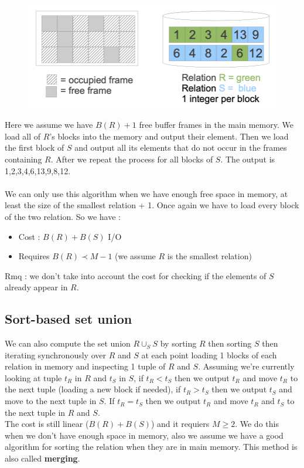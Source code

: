 \documentclass[12pt,a4paper]{article}
\begin{document}
\begin{figure}
\vspace{-5mm}
\includegraphics[scale=0.4]{img/img58.png}
\end{figure}
Here we assume we have $B(R) + 1$ free buffer frames in the main memory. We load all of $R$'s blocks into the memory and output their element. Then we load the first block of $S$ and output all its elements that do not occur in the frames containing $R$. After we repeat the process for all blocks of $S$. The output is 1,2,3,4,6,13,9,8,12.\\ 
\\
We can only use this algorithm when we have enough free space in memory, at least the size of the smallest relation + 1. Once again we have to load every block of the two relation. So we have :
\begin{itemize}
\item Cost : $B(R) + B(S)$ I/O
\item Requires $B(R) \prec M - 1$ (we assume $R$ is the smallest relation)
\end{itemize}
Rmq : we don't take into account the cost for checking if the elements of $S$ already appear in $R$. 

\subsection{Sort-based set union}
We can also compute the set union $R \cup_S S$ by sorting $R$ then sorting $S$ then iterating synchronously over $R$ and $S$ at each point loading 1 blocks of each relation in memory and inspecting 1 tuple of $R$ and $S$. Assuming we're currently looking at tuple $t_R$ in $R$ and $t_S$ in $S$, if $t_R < t_S$ then we output $t_R$ and move $t_R$ to the next tuple (loading a new block if needed), if $t_R > t_S$ then we output $t_S$ and move to the next tuple in $S$. If $t_R = t_S$ then we output $t_R$ and move $t_R$ and $t_S$ to the next tuple in $R$ and $S$.\\ 
The cost is still linear ($B(R) + B(S)$) and it requiers $M \geq 2$. 
We do this when we don't have enough space in memory, also we assume we have a good algorithm for sorting the relation when they are in main memory. This method is also called \textbf{merging}.\\
\end{document}
